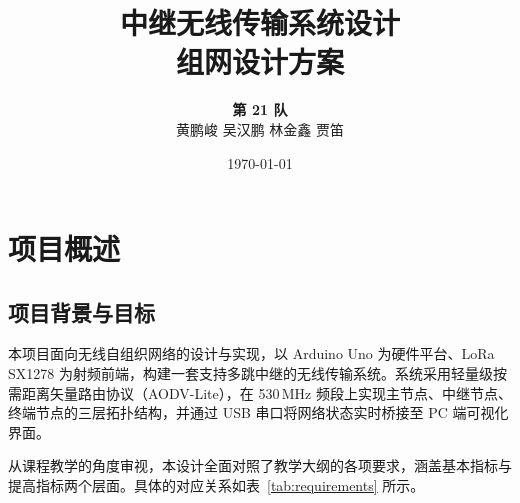 \documentclass[12pt,a4paper]{ctexart}
\title{
    \vspace{1.5cm}
    {\Huge \textbf{中继无线传输系统设计}}\\[0.4cm]
    {\LARGE 组网设计方案}\\[0.8cm]
    \vspace{0.8cm}
}
\author{
    \textbf{第 21 队}\\[0.2cm]
    黄鹏峻 \quad 吴汉鹏 \quad 林金鑫 \quad 贾笛
}
\date{\today}
\begin{document}
\maketitle
\thispagestyle{empty}
\newpage

\tableofcontents
\newpage

\section{项目概述}

\subsection{项目背景与目标}

本项目面向无线自组织网络的设计与实现，以 Arduino Uno 为硬件平台、LoRa SX1278 为射频前端，构建一套支持多跳中继的无线传输系统。系统采用轻量级按需距离矢量路由协议（AODV-Lite），在 530\,MHz 频段上实现主节点、中继节点、终端节点的三层拓扑结构，并通过 USB 串口将网络状态实时桥接至 PC 端可视化界面。

从课程教学的角度审视，本设计全面对照了教学大纲的各项要求，涵盖基本指标与提高指标两个层面。具体的对应关系如表~\ref{tab:requirements} 所示。
\end{document}
